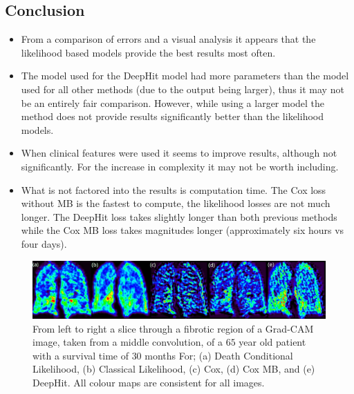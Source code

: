 \documentclass[portrait, color=UCLburgundy, margin=1cm]{uclposter}
\begin{document}
\begin{multicols}{2}
        \section*{Conclusion}
            \begin{highlightbox}[UCLlightgreen]
                \begin{itemize}
                    \item From a comparison of errors and a visual analysis it appears that the likelihood based models provide the best results most often.
                    
                    \item The model used for the DeepHit model had more parameters than the model used for all other methods (due to the output being larger), thus it may not be an entirely fair comparison. However, while using a larger model the method does not provide results significantly better than the likelihood models.
                    
                    \item When clinical features were used it seems to improve results, although not significantly. For the increase in complexity it may not be worth including.
                    
                    \item What is not factored into the results is computation time. The Cox loss without \gls{MB} is the fastest to compute, the likelihood losses are not much longer. The DeepHit loss takes slightly longer than both previous methods while the Cox \gls{MB} loss takes magnitudes longer (approximately six hours vs four days).
                \end{itemize}
            \end{highlightbox}
        
        \AtNextBibliography{\small}
        \printbibliography
    \end{multicols}

    \begin{figure}[H]
        \centering

        \includegraphics[width=1.0\linewidth]{grad_cam_label.png}
        
        \captionsetup{singlelinecheck=false, justification=centering}
        \caption{
            From left to right a slice through a fibrotic region of a Grad-CAM image, taken from a middle convolution, of a $65$ year old patient with a survival time of $30$ months For; (a) Death Conditional Likelihood, (b) Classical Likelihood, (c) Cox, (d) Cox \gls{MB}, and (e) DeepHit. All colour maps are consistent for all images.
        }
   \end{figure}
\end{document}
